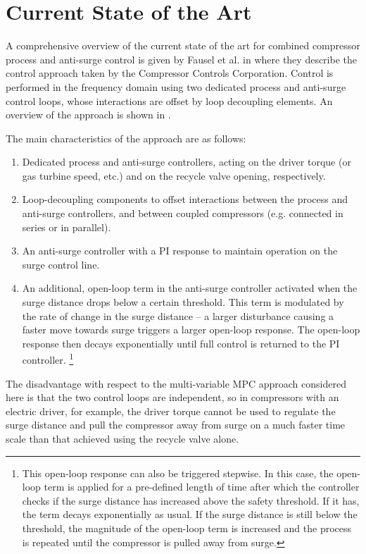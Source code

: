 \section{Current State of the Art}
\label{sec:lit:sota}

A comprehensive overview of the current state of the art for combined compressor process and anti-surge control is given by Fausel et al. in \cite{Fausel2010} where they describe the control approach taken by the Compressor Controls Corporation.
Control is performed in the frequency domain using two dedicated process and anti-surge control loops, whose interactions are offset by loop decoupling elements.
An overview of the approach is shown in .

The main characteristics of the approach are as follows:

\begin{enumerate}
  \item Dedicated process and anti-surge controllers, acting on the driver torque (or gas turbine speed, etc.) and on the recycle valve opening, respectively.
  \item Loop-decoupling components to offset interactions between the process and anti-surge controllers, and between coupled compressors (e.g. connected in series or in parallel).
  \item An anti-surge controller with a PI response to maintain operation on the surge control line.
  \item An additional, open-loop term in the anti-surge controller activated when the surge distance drops below a certain threshold. 
    This term is modulated by the rate of change in the surge distance -- a larger disturbance causing a faster move towards surge triggers a larger open-loop response. 
    The open-loop response then decays exponentially until full control is returned to the PI controller.
    \footnote{This open-loop response can also be triggered stepwise. 
      In this case, the open-loop term is applied for a pre-defined length of time after which the controller checks if the surge distance has increased above the safety threshold. 
      If it has, the term decays exponentially as usual. 
    If the surge distance is still below the threshold, the magnitude of the open-loop term is increased and the process is repeated until the compressor is pulled away from surge.}
\end{enumerate}

The disadvantage with respect to the multi-variable MPC approach considered here is that the two control loops are independent, so in compressors with an electric driver, for example, the driver torque cannot be used to regulate the surge distance and pull the compressor away from surge on a much faster time scale than that achieved using the recycle valve alone.

